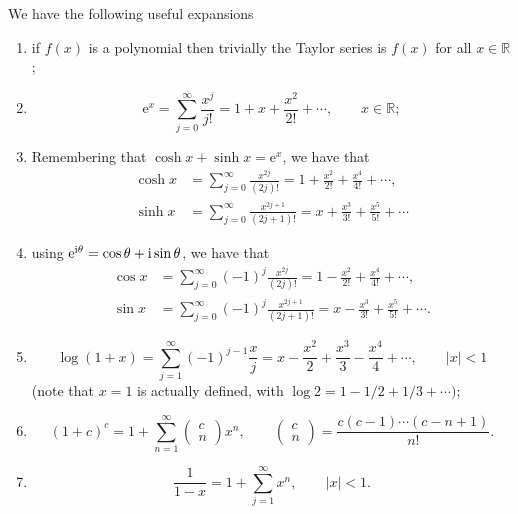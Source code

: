 \documentclass[letter-paper]{tufte-book}
\newcommand{\ex}{\mathrm{e}}
\newcommand{\zi}{{\rm i}}
\begin{document}
We have the following useful expansions
\begin{enumerate}
  \item if $f(x)$ is a polynomial then trivially the Taylor series is $f(x)$
  for all $x\in\mathbb{R}$;
  
  \item
  \begin{equation*}
    \ex^x = \sum_{j=0}^\infty \frac{x^j}{j!} = 1 + x + \frac{x^2}{2!}+\cdots,
    \qquad x\in\mathbb{R};
  \end{equation*}
  
  \item Remembering that $\cosh x + \sinh x = \ex^x$, we have that
  \begin{align*}
    \cosh x &= \sum_{j=0}^\infty \frac{x^{2j}}{(2j)!} = 
    1 + \frac{x^2}{2!} + \frac{x^4}{4!}+\cdots, \\
    \sinh x &= \sum_{j=0}^\infty \frac{x^{2j+1}}{(2j+1)!} = 
    x + \frac{x^3}{3!} + \frac{x^5}{5!}+\cdots
  \end{align*}
  
  \item using $\ex^{\zi\theta}=\cos\theta + \zi\sin\theta$, we have that
  \begin{align*}
    \cos x &= \sum_{j=0}^\infty (-1)^{j}\frac{x^{2j}}{(2j)!}
    = 1 - \frac{x^2}{2!} + \frac{x^4}{4!} + \cdots, \\
    \sin x &= \sum_{j=0}^\infty (-1)^{j}\frac{x^{2j+1}}{(2j+1)!}
    = x - \frac{x^3}{3!} + \frac{x^5}{5!} + \cdots.
  \end{align*}
  
  \item
  \begin{equation*}
    \log(1+x) = \sum_{j=1}^\infty (-1)^{j-1} \frac{x}{j}
    = x - \frac{x^2}{2} + \frac{x^3}{3} - \frac{x^4}{4}+\cdots,\qquad
    |x|<1
  \end{equation*}
  (note that $x=1$ is actually defined, with $\log 2=1-1/2+1/3+\cdots)$;
  
  \item
  \begin{equation*}
    (1+c)^c = 1 + \sum_{n=1}^\infty\begin{pmatrix}c\\ n\end{pmatrix}x^n,\qquad
    \begin{pmatrix}c\\ n\end{pmatrix} = \frac{c(c-1)\cdots(c-n+1)}{n!}.
  \end{equation*}
  
  \item
  \begin{equation*}
    \frac{1}{1-x} = 1 + \sum_{j=1}^\infty x^n,\qquad |x|<1.
  \end{equation*}
\end{enumerate}
\end{document}
